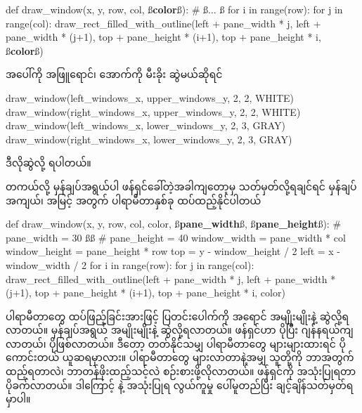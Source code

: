 %
\begin{py}
def draw_window(x, y, row, col, ß\textbf{color}ß):
    # ß$\ldots$ ß
    for i in range(row):
        for j in range(col):
            draw_rect_filled_with_outline(left + pane_width * j,
                                          left + pane_width * (j+1),
                                          top + pane_height * (i+1),
                                          top + pane_height * i,
                                          ß\textbf{color}ß)
\end{py}
%
အပေါ်ကို အဖြူရောင်၊ အောက်ကို မီးခိုး ဆွဲမယ်ဆိုရင်
%
\begin{py}
draw_window(left_windows_x, upper_windows_y, 2, 2, WHITE)
draw_window(right_windows_x, upper_windows_y, 2, 2, WHITE)
draw_window(left_windows_x, lower_windows_y, 2, 3, GRAY)
draw_window(right_windows_x, lower_windows_y, 2, 3, GRAY)
\end{py}
%
ဒီလိုဆွဲလို့ ရပါတယ်။

တကယ်လို့ မှန်ချပ်အရွယ်ပါ ဖန်ရှင်ခေါ်တဲ့အခါကျတော့မှ သတ်မှတ်လို့ရချင်ရင် မှန်ချပ် အကျယ်၊ အမြင့် အတွက် ပါရာမီတာနှစ်ခု ထပ်ထည့်နိုင်ပါတယ်
%
\begin{py}
def draw_window(x, y, row, col, color, ß\textbf{pane\_width}ß, ß\textbf{pane\_height}ß):
    # pane_width = 30  ßß
    # pane_height = 40  
    window_width = pane_width * col
    window_height = pane_height * row
    top = y - window_height / 2
    left = x - window_width / 2
    for i in range(row):
        for j in range(col):
            draw_rect_filled_with_outline(left + pane_width * j,
                                          left + pane_width * (j+1),
                                          top + pane_height * (i+1),
                                          top + pane_height * i,
                                          color)
\end{py}
%
ပါရာမီတာတွေ ထပ်ဖြည့်ခြင်းအားဖြင့် ပြတင်းပေါက်ကို အရောင် အမျိုးမျိုးနဲ့ ဆွဲလို့ရလာတယ်။ မှန်ချပ်အရွယ် အမျိုးမျိုးနဲ့ ဆွဲလို့ရလာတယ်။ ဖန်ရှင်ဟာ ပိုပြီး ဂျန်နရယ်ကျလာတယ်၊  ပိုဖြစ်လာတယ်။ ဒီတော့ တတ်နိုင်သမျှ ပါရာမီတာတွေ များများထားရင် ပိုကောင်းတယ် ယူဆရမှာလား။ ပါရာမီတာတွေ များလာတာနဲ့အမျှ သူတို့ကို ဘာအတွက်ထည့်ရတာလဲ၊ ဘာတန်ဖိုးထည့်သင့်လဲ စဉ်းစားဖို့လိုလာတယ်။ ဖန်ရှင်ကို အသုံးပြုရတာ ပိုခက်လာတယ်။ ဒါကြောင့်  နဲ့ အသုံးပြုရ လွယ်ကူမှု ပေါ်မူတည်ပြီး ချင့်ချိန်သတ်မှတ်ရမှာပါ။


